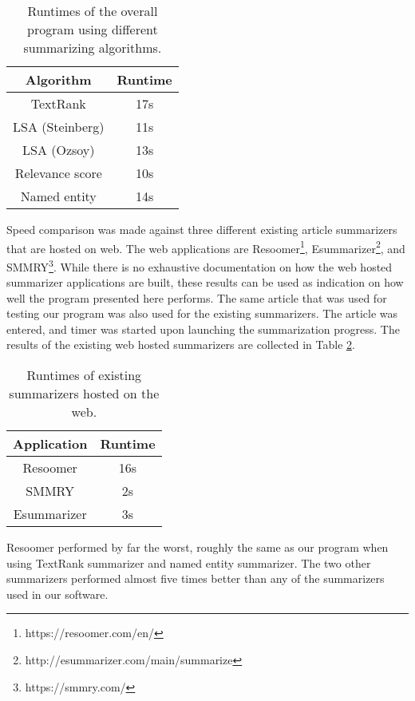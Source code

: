 \documentclass[conference]{IEEEtran}
\begin{document}
\begin{table}[!t]
	\renewcommand{\arraystretch}{1.5}
	\caption{Runtimes of the overall program using different summarizing algorithms.}
	\begin{center}
		\begin{tabular}{c|c}
			\hline
			\hline
			Algorithm & Runtime  \\
			\hline
			TextRank & 17s \\
			LSA (Steinberg) & 11s \\
			LSA (Ozsoy) & 13s \\
			Relevance score & 10s \\
			Named entity & 14s \\
			\hline
			\hline
		\end{tabular}
		\label{perfs}
	\end{center}
\end{table}

Speed comparison was made against three different existing article summarizers that are hosted on web. The web applications are Resoomer\footnote{https://resoomer.com/en/}, Esummarizer\footnote{http://esummarizer.com/main/summarize}, and SMMRY\footnote{https://smmry.com/}. While there is no exhaustive documentation on how the web hosted summarizer applications are built, these results can be used as indication on how well the program presented here performs. The same article that was used for testing our program was also used for the existing summarizers. The article was entered, and timer was started upon launching the summarization progress. The results of the existing web hosted summarizers are collected in Table \ref{webperf}.

\begin{table}[!b]
	\renewcommand{\arraystretch}{1.5}
	\caption{Runtimes of existing summarizers hosted on the web.}
	\begin{center}
		\begin{tabular}{c|c}
			\hline
			\hline
			Application & Runtime  \\
			\hline
			Resoomer & 16s \\
			SMMRY & 2s \\
			Esummarizer & 3s \\
			\hline
			\hline
		\end{tabular}
		\label{webperf}
	\end{center}
\end{table}

Resoomer performed by far the worst, roughly the same as our program when using TextRank summarizer and named entity summarizer. The two other summarizers performed almost five times better than any of the summarizers used in our software. 
\end{document}

